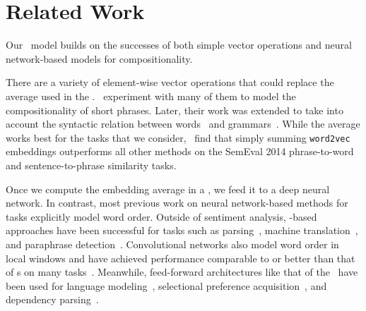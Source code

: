 \section{Related Work}
\label{sec:related}








Our \dan\ model builds on the successes of both
simple vector operations and neural network-based models for compositionality.

There are a variety of element-wise vector operations that could replace the average used in the \dan.~ experiment with many of them to model the compositionality of short phrases. Later, their work was extended to take into account the
syntactic relation between
words~\cite{erk08,baroni2010nouns,kartsaklis2013prior} and
grammars~\cite{coecke2010mathematical,grefenstette2011experimental}. While the average works best for the tasks that we consider,~ find that simply summing \texttt{word2vec} embeddings outperforms all other methods on the SemEval 2014 phrase-to-word and sentence-to-phrase similarity tasks.

Once we compute the embedding average in a \dan, we feed it to a deep neural
network. In contrast, most previous work on neural network-based methods for
 tasks explicitly model word order. Outside of sentiment analysis, \recnn-based approaches have been
successful for tasks such as parsing~\cite{SocherEtAl2013:CVG}, machine translation~\cite{liu2014recursive}, and paraphrase
detection~\cite{SocherEtAl2011:PoolRAE}. Convolutional networks also model word order in
local windows and have achieved performance comparable to or better than that of
\recnn s on many tasks~\cite{collobert2008unified,kim:2014:EMNLP2014}. Meanwhile, feed-forward architectures like that of the \dan\ have been used for language modeling~\cite{Bengio03aneural}, selectional preference acquisition~\cite{van2014neural}, and dependency parsing~\cite{chen2014fast}.











